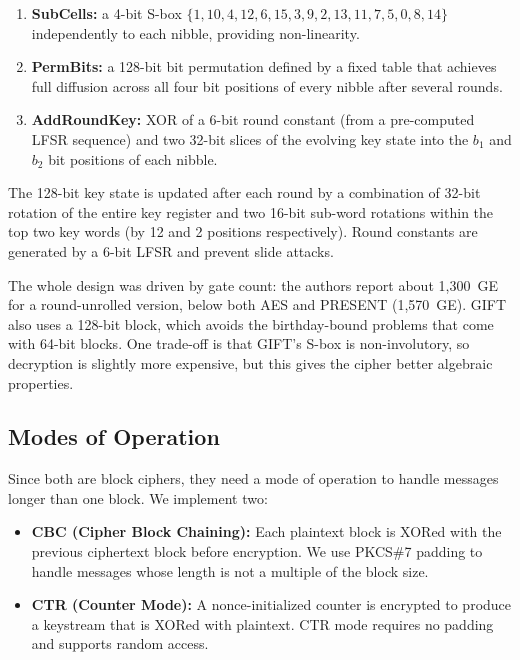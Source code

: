 \documentclass[conference]{IEEEtran}
\begin{document}
\begin{enumerate}
\item \textbf{SubCells:} a 4-bit S-box $\{1,10,4,12,6,15,3,9,2,13,11,7,5,0,8,14\}$ independently to each nibble, providing non-linearity.
\item \textbf{PermBits:} a 128-bit bit permutation defined by a fixed table
      that achieves full diffusion across all four bit positions of every
      nibble after several rounds.
\item \textbf{AddRoundKey:} XOR of a 6-bit round constant (from a
      pre-computed LFSR sequence) and two 32-bit slices of the evolving key
      state into the $b_1$ and $b_2$ bit positions of each nibble.
\end{enumerate}

The 128-bit key state is updated after each round by a combination of
32-bit rotation of the entire key register and two 16-bit sub-word
rotations within the top two key words (by 12 and 2 positions
respectively).  Round constants are generated by a 6-bit LFSR and prevent
slide attacks.

The whole design was driven by gate count: the authors report about
1,300~GE for a round-unrolled version, below both AES and
PRESENT (1,570~GE).  GIFT also uses a 128-bit block, which avoids the
birthday-bound problems that come with 64-bit blocks.  One trade-off is
that GIFT's S-box is non-involutory, so decryption is slightly more
expensive, but this gives the cipher better algebraic properties.

\subsection{Modes of Operation}

Since both are block ciphers, they need a mode of operation to handle
messages longer than one block.  We implement two:

\begin{itemize}
\item \textbf{CBC (Cipher Block Chaining):} Each plaintext block is XORed
      with the previous ciphertext block before encryption.  We use PKCS\#7
      padding to handle messages whose length is not a multiple of the block
      size.
\item \textbf{CTR (Counter Mode):} A nonce-initialized counter is encrypted
      to produce a keystream that is XORed with plaintext.  CTR mode
      requires no padding and supports random access.
\end{itemize}
\end{document}
